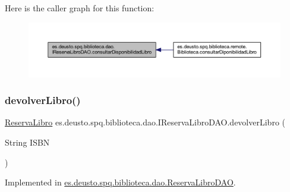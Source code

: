 Here is the caller graph for this function\+:
\nopagebreak
\begin{figure}[H]
\begin{center}
\leavevmode
\includegraphics[width=350pt]{interfacees_1_1deusto_1_1spq_1_1biblioteca_1_1dao_1_1_i_reserva_libro_d_a_o_a56903b304697f889b59fb782a4e61aaf_icgraph}
\end{center}
\end{figure}
\mbox{\label{interfacees_1_1deusto_1_1spq_1_1biblioteca_1_1dao_1_1_i_reserva_libro_d_a_o_a3a772c69bb728d2e32b1767101a05efd}} 
\subsubsection{\texorpdfstring{devolver\+Libro()}{devolverLibro()}}
{\footnotesize\ttfamily \mbox{\hyperlink{classes_1_1deusto_1_1spq_1_1biblioteca_1_1data_1_1_reserva_libro}{Reserva\+Libro}} es.\+deusto.\+spq.\+biblioteca.\+dao.\+I\+Reserva\+Libro\+D\+A\+O.\+devolver\+Libro (\begin{DoxyParamCaption}\item[{String}]{I\+S\+BN }\end{DoxyParamCaption})}



Implemented in \mbox{\hyperlink{classes_1_1deusto_1_1spq_1_1biblioteca_1_1dao_1_1_reserva_libro_d_a_o_a6de362edada8a27bc4403808aafba6a1}{es.\+deusto.\+spq.\+biblioteca.\+dao.\+Reserva\+Libro\+D\+AO}}.

